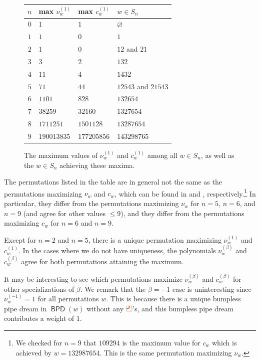 \documentclass[11pt]{article}
\theoremstyle{definition}
\numberwithin{equation}{section}
\DeclareMathOperator{\BPD}{\mathsf{BPD}}
\newcommand{\pipecolor}{UForange}
\newcommand{\tilescale}{0.27}
\newcommand{\drawSquare}{
    \draw[
        xshift=0.5cm,yshift=0.5cm,
        black,opacity=0.5,thin
    ] (0,0) rectangle (1,1);
}
\newcommand{\drawJelbow}[2]{
    \draw[color=\pipecolor,very thick]
    (#1,#2+0.5) to (#1,#2+0.25) to[bend left] (#1-0.25,#2) to (#1-0.5,#2);
}
\newcommand{\jelbow}[1][scale=\tilescale,baseline=4pt]{
    \begin{tikzpicture}[#1]
    \drawSquare
    \drawJelbow11
    \end{tikzpicture}
}
\begin{document}
\begin{figure}
    \centering
    \begin{tabular}{|c|l|l|l|}
        \hline
        $n$ & max $\nu^{(1)}_w$ & max $c^{(1)}_w$ & $w\in S_n$ \\
        \hline
        $0$ & $1$ & $1$ & $\varnothing$ \\
        $1$ & $1$ & $0$ & $1$ \\
        $2$ & $1$ & $0$ & $12$ and $21$ \\
        $3$ & $3$ & $2$ & $132$ \\
        $4$ & $11$ & $4$ & $1432$ \\
        $5$ & $71$ & $44$ & $12543$ and $21543$ \\
        $6$ & $1101$ & $828$ & $132654$ \\
        $7$ & $38259$ & $32160$ & $1327654$ \\
        $8$ & $1711251$ & $1501128$ & $13287654$ \\
        $9$ & $190013835$ & $177205856$ & $143298765$ \\
        \hline
    \end{tabular}
    \caption{The maximum values of $\nu^{(1)}_w$ and $c^{(1)}_w$ among all $w\in S_n$, as well as the $w\in S_n$ achieving these maxima.}
    \label{fig:max}
\end{figure}

The permutations listed in the table are in general not the same as the permutations maximizing $\nu_w$ and $c_w$, which can be found in \cite{Sta17} and \cite{Gao21}, respectively.\footnote{
    We checked for $n=9$ that $109294$ is the maximum value for $c_w$ which is achieved by $w = 132987654$.
    This is the same permutation maximizing $\nu_w$.
}
In particular, they differ from the permutations maximizing $\nu_w$ for $n=5$, $n=6$, and $n=9$ (and agree for other values $\leq 9$), and they differ from the permutations maximizing $c_w$ for $n=6$ and $n=9$.

Except for $n=2$ and $n=5$, there is a unique permutation maximizing $\nu^{(1)}_w$ and $c^{(1)}_w$.
In the cases where we do not have uniqueness, the polynomials $\nu^{(\beta)}_w$ and $c^{(\beta)}_w$ agree for both permutations attaining the maximum.

It may be interesting to see which permutations maximize $\nu^{(\beta)}_w$ and $c^{(\beta)}_w$ for other specializations of $\beta$.
We remark that the $\beta=-1$ case is uninteresting since $\nu^{(-1)}_w = 1$ for all permutations $w$.
This is because there is a unique bumpless pipe dream in $\BPD(w)$ without any $\jelbow$'s, and this bumpless pipe dream contributes a weight of $1$.
\end{document}

